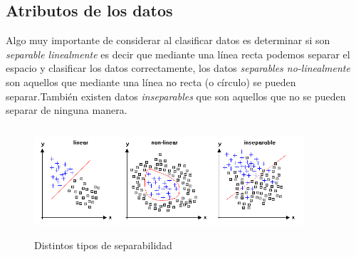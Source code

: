 \documentclass{article}
\begin{document}
\subsection{Atributos de los datos}
Algo muy importante de considerar al clasificar datos es determinar si son \textit{separable linealmente} es decir que mediante una línea recta podemos separar el espacio y clasificar los datos correctamente, los datos \textit{separables no-linealmente} son aquellos que mediante una línea no recta (o círculo) se pueden separar.También existen datos \textit{inseparables} que son aquellos que no se pueden separar de ninguna manera.
\begin{figure}[h]
\centering
\includegraphics[width=10cm, height=4cm]{hl_classif_separation.png}
\caption{Distintos tipos de separabilidad}
\label{fig:my_label}
\end{figure}
\end{document}
